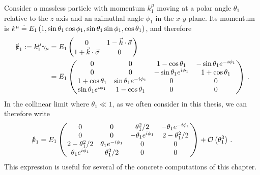 \begin{subappendices}
\begin{example}
    \label{ex:collinear-kslash}
    Consider a massless particle with momentum \(k_1^\mu\) moving at a polar angle \(\theta_1\) relative to the \(z\) axis and an azimuthal angle \(\phi_1\) in the \(x\)-\(y\) plane.
    Its momentum is \(k^\mu \overset{\boldsymbol{\cdot}}{=} E_1 \left(1, \sin\theta_1\cos\phi_1, \sin\theta_1 \sin\phi_1,\cos\theta_1\right)\), and therefore
    \begin{align}
        \slashed{k}_1
        :=
        k_1^\mu \gamma_\mu
        &=
        E_1 \begin{pmatrix}0 & 1 - \vec{k}\cdot \vec{\sigma} \\ 1 +  \vec{k}\cdot \vec{\sigma} & 0\end{pmatrix}
        \\
        &=
        E_1
        \begin{pmatrix}
            0&0&1 - \cos\theta_1& -\sin\theta_1 e^{-i\phi_1}
            \\
            0&0& -\sin\theta_1 e^{i\phi_1} & 1 + \cos\theta_1
            \\
            1 + \cos\theta_1 & \sin\theta_1 e^{-i\phi_1} & 0 & 0
            \\
            \sin\theta_1 e^{i\phi_1} & 1 - \cos\theta_1 & 0 & 0
        \end{pmatrix}
        \,.
    \end{align}
    In the collinear limit where \(\theta_1 \ll 1\), as we often consider in this thesis, we can therefore write
    \begin{align}
        \slashed{k}_1
        =
        E_1
        \begin{pmatrix}
            0&0& \theta_1^2/2 & -\theta_1 e^{-i\phi_1}
            \\
            0&0 & -\theta_1 e^{i\phi_1} & 2 - \theta_1^2/2
            \\
            2 - \theta_1^2/2 & \theta_1 e^{-i\phi_1} & 0 & 0
            \\
            \theta_1 e^{i \phi_1} & \theta_1^2/2 & 0 & 0
        \end{pmatrix}
        +
        \mathcal{O}\left(\theta_1^3\right)
        \,.
    \end{align}
    This expression is useful for several of the concrete computations of this chapter.
\end{example}




\end{subappendices}
